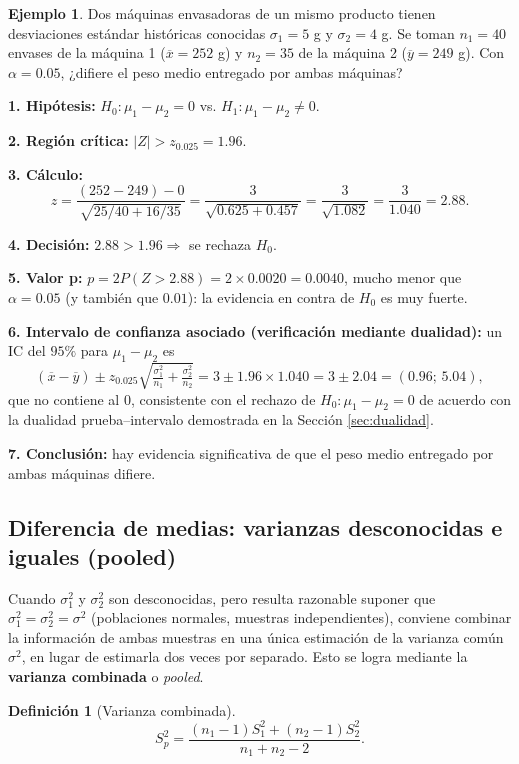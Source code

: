 \documentclass[11pt,a4paper]{article}
\theoremstyle{plain}
\theoremstyle{definition}
\newtheorem{definicion}[teorema]{Definición}
\newtheorem{ejemplo}[teorema]{Ejemplo}
\theoremstyle{remark}
\begin{document}
\begin{ejemplo}
Dos máquinas envasadoras de un mismo producto tienen desviaciones estándar históricas conocidas $\sigma_1=5$ g y $\sigma_2=4$ g. Se toman $n_1=40$ envases de la máquina 1 ($\overline x=252$ g) y $n_2=35$ de la máquina 2 ($\overline y=249$ g). Con $\alpha=0.05$, ¿difiere el peso medio entregado por ambas máquinas?

\textbf{1. Hipótesis:} $H_0:\mu_1-\mu_2=0$ vs. $H_1:\mu_1-\mu_2\neq0$.

\textbf{2. Región crítica:} $|Z|>z_{0.025}=1.96$.

\textbf{3. Cálculo:}
\[
z=\frac{(252-249)-0}{\sqrt{25/40+16/35}}=\frac{3}{\sqrt{0.625+0.457}}=\frac{3}{\sqrt{1.082}}=\frac{3}{1.040}=2.88.
\]

\textbf{4. Decisión:} $2.88>1.96\Rightarrow$ se rechaza $H_0$.

\textbf{5. Valor p:} $p=2P(Z>2.88)=2\times0.0020=0.0040$, mucho menor que $\alpha=0.05$ (y también que $0.01$): la evidencia en contra de $H_0$ es muy fuerte.

\textbf{6. Intervalo de confianza asociado (verificación mediante dualidad):} un IC del $95\%$ para $\mu_1-\mu_2$ es
\[
(\overline x-\overline y)\pm z_{0.025}\sqrt{\tfrac{\sigma_1^2}{n_1}+\tfrac{\sigma_2^2}{n_2}} = 3\pm1.96\times1.040 = 3\pm2.04 = (0.96;\,5.04),
\]
que no contiene al $0$, consistente con el rechazo de $H_0:\mu_1-\mu_2=0$ de acuerdo con la dualidad prueba--intervalo demostrada en la Sección \ref{sec:dualidad}.

\textbf{7. Conclusión:} hay evidencia significativa de que el peso medio entregado por ambas máquinas difiere.
\end{ejemplo}

\subsection{Diferencia de medias: varianzas desconocidas e iguales (pooled)}

Cuando $\sigma_1^2$ y $\sigma_2^2$ son desconocidas, pero resulta razonable suponer que $\sigma_1^2=\sigma_2^2=\sigma^2$ (poblaciones normales, muestras independientes), conviene combinar la información de ambas muestras en una única estimación de la varianza común $\sigma^2$, en lugar de estimarla dos veces por separado. Esto se logra mediante la \textbf{varianza combinada} o \emph{pooled}.

\begin{definicion}[Varianza combinada]
\[
S_p^2=\frac{(n_1-1)S_1^2+(n_2-1)S_2^2}{n_1+n_2-2}.
\]
\end{definicion}
\end{document}
